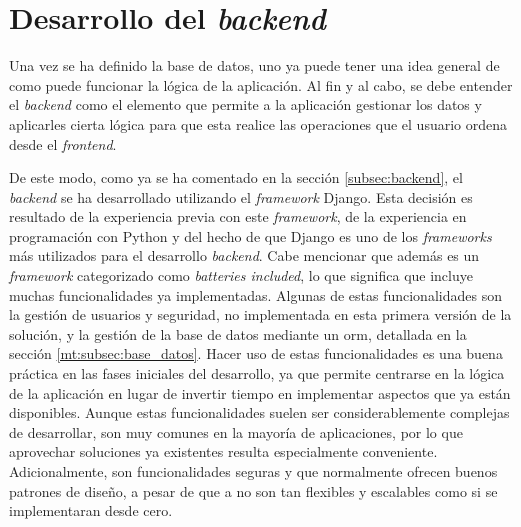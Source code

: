 \section{Desarrollo del \textit{backend}}
\label{dev:sec:desarrollo_backend}

Una vez se ha definido la base de datos, uno ya puede tener una idea general de como puede funcionar la lógica de la aplicación. Al fin y al cabo, se debe entender el \textit{backend} como el elemento que permite a la aplicación gestionar los datos y aplicarles cierta lógica para que esta realice las operaciones que el usuario ordena desde el \textit{frontend}.

De este modo, como ya se ha comentado en la sección \ref{subsec:backend}, el \textit{backend} se ha desarrollado utilizando el \textit{framework} Django. Esta decisión es resultado de la experiencia previa con este \textit{framework}, de la experiencia en programación con Python y del hecho de que Django es uno de los \textit{frameworks} más utilizados para el desarrollo \textit{backend}. Cabe mencionar que además es un \textit{framework} categorizado como \textit{batteries included}, lo que significa que incluye muchas funcionalidades ya implementadas. Algunas de estas funcionalidades son la gestión de usuarios y seguridad, no implementada en esta primera versión de la solución, y la gestión de la base de datos mediante un \gls{orm}, detallada en la sección \ref{mt:subsec:base_datos}. Hacer uso de estas funcionalidades es una buena práctica en las fases iniciales del desarrollo, ya que permite centrarse en la lógica de la aplicación en lugar de invertir tiempo en implementar aspectos que ya están disponibles. Aunque estas funcionalidades suelen ser considerablemente complejas de desarrollar, son muy comunes en la mayoría de aplicaciones, por lo que aprovechar soluciones ya existentes resulta especialmente conveniente. Adicionalmente, son funcionalidades seguras y que normalmente ofrecen buenos patrones de diseño, a pesar de que a no son tan flexibles y escalables como si se implementaran desde cero.

